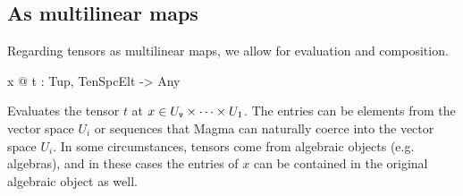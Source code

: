 \subsection{As multilinear maps}
Regarding tensors as multilinear maps, we allow for evaluation and composition.

\begin{intrinsics}
x @ t : Tup, TenSpcElt -> Any
\end{intrinsics}

Evaluates the tensor $t$ at $x\in U_{\operatorname{\mathtt{v}}}\times \cdots \times U_1$. The entries
can be elements from the vector space $U_i$ or sequences that \textsf{Magma} can
naturally coerce into the vector space $U_i$. In some circumstances, tensors
come from algebraic objects (e.g.\! algebras), and in these cases the entries of
$x$ can be contained in the original algebraic object as well. 

